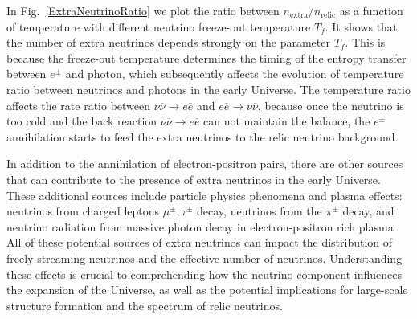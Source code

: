 In Fig.~\ref{ExtraNeutrinoRatio} we plot the ratio between $n_\mathrm{extra}/n_\mathrm{relic}$ as a function of temperature with different neutrino freeze-out temperature $T_f$. It shows that the number of extra neutrinos depends strongly on the parameter $T_f$. This is because the freeze-out temperature determines the timing of the entropy transfer between $e^\pm$ and photon, which subsequently affects the evolution of temperature ratio between neutrinos and photons in the early Universe. The temperature ratio affects the rate ratio between $\nu\overline{\nu}\to e\overline{e}$ and $ e\overline{e}\to\nu\overline{\nu}$, because once the neutrino is too cold and the back reaction $\nu\overline{\nu}\to e\overline{e}$ can not maintain the balance, the $e^\pm$ annihilation starts to feed the extra neutrinos to the relic neutrino background. 

In addition to the annihilation of electron-positron pairs, there are other sources that can contribute to the presence of extra neutrinos in the early Universe. These additional sources include particle physics phenomena and plasma effects: neutrinos from charged leptons $\mu^\pm,\tau^\pm$ decay, neutrinos from the $\pi^\pm$ decay, and neutrino radiation from massive photon decay in electron-positron rich plasma. All of these potential sources of extra neutrinos can impact the distribution of freely streaming neutrinos and the effective number of neutrinos. Understanding these effects is crucial to comprehending how the neutrino component influences the expansion of the Universe, as well as the potential implications for large-scale structure formation and the spectrum of relic neutrinos.

